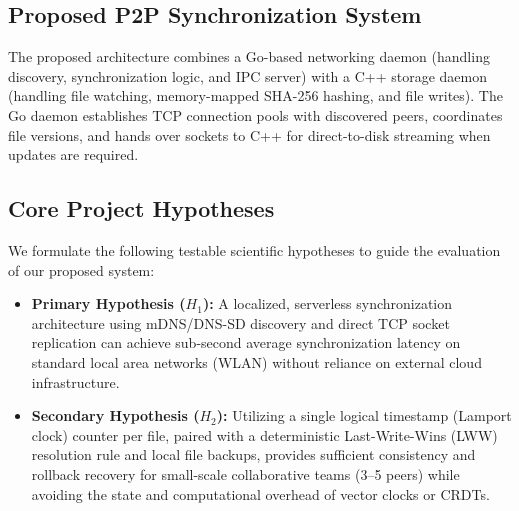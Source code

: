 \subsection{Proposed P2P Synchronization System}
The proposed architecture combines a Go-based networking daemon (handling discovery, synchronization logic, and IPC server) with a C++ storage daemon (handling file watching, memory-mapped SHA-256 hashing, and file writes). The Go daemon establishes TCP connection pools with discovered peers, coordinates file versions, and hands over sockets to C++ for direct-to-disk streaming when updates are required.
\subsection{Core Project Hypotheses}
We formulate the following testable scientific hypotheses to guide the evaluation of our proposed system:
\begin{itemize}
    \item \textbf{Primary Hypothesis ($H_1$):} A localized, serverless synchronization architecture using mDNS/DNS-SD discovery and direct TCP socket replication can achieve sub-second average synchronization latency on standard local area networks (WLAN) without reliance on external cloud infrastructure.
    \item \textbf{Secondary Hypothesis ($H_2$):} Utilizing a single logical timestamp (Lamport clock) counter per file, paired with a deterministic Last-Write-Wins (LWW) resolution rule and local file backups, provides sufficient consistency and rollback recovery for small-scale collaborative teams (3–5 peers) while avoiding the state and computational overhead of vector clocks or CRDTs.
\end{itemize}
